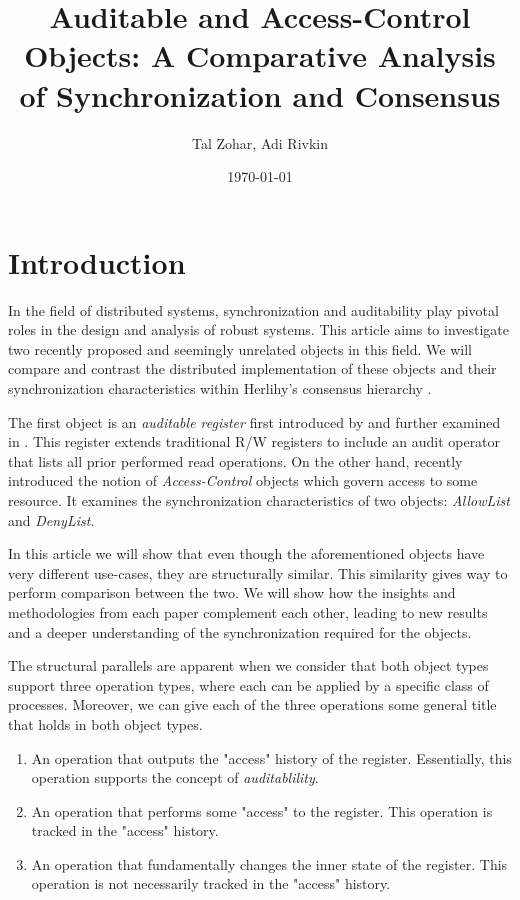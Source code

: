 \documentclass[11pt]{article}
\title{Auditable and Access-Control Objects: A Comparative Analysis of Synchronization and Consensus}
\author{Tal Zohar, Adi Rivkin}
\date{\today}
\theoremstyle{definition}
\begin{document}
    \maketitle

\section{Introduction}	
In the field of distributed systems, synchronization and auditability play pivotal roles in the design and analysis of robust systems. 
This article aims to investigate two recently proposed and seemingly unrelated objects in this field. We will compare and contrast the distributed implementation of these objects and their synchronization characteristics within Herlihy’s consensus hierarchy \cite{herlihy1991wait}. 

The first object is an \textit{auditable register} first introduced by \cite{cogo_et_al:LIPIcs.DISC.2021.53} and further examined in \cite{AuditableRegs}. This register extends traditional R/W registers to include an audit operator that lists all prior performed read operations.
On the other hand, \cite{AccessControl} recently introduced the notion of \textit{Access-Control} objects which govern access to some resource. It examines the synchronization characteristics of two objects: \textit{AllowList} and \textit{DenyList}.

In this article we will show that even though the aforementioned objects have very different use-cases, they are structurally similar. This similarity gives way to perform comparison between the two. We will show how the insights and methodologies from each paper complement each other, leading to new results and a deeper understanding of the synchronization required for the objects. 

The structural parallels are apparent when we consider that both object types support three operation types, where each can be applied by a specific class of processes. Moreover, we can give each of the three operations some general title that holds in both object types.
\begin{enumerate}
    \item An operation that outputs the "access" history of the register. Essentially, this operation supports the concept of \textit{auditablility}.
    \item An operation that performs some "access" to the register. This operation is tracked in the "access" history.
    \item An operation that fundamentally changes the inner state of the register. This operation is not necessarily tracked in the "access" history.
\end{enumerate}
\end{document}
